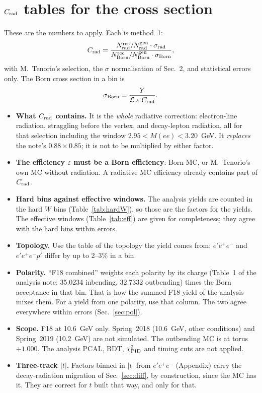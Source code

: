 \documentclass[11pt]{article}
\newcommand{\crad}{C_{\rm rad}}
\begin{document}
\section{$\crad$ tables for the cross section}\label{sec:tables}
These are the numbers to apply. Each is method~1:
\[
\crad = \frac{N^{\rm rec}_{\rm rad}/N^{\rm gen}_{\rm rad}\cdot\sigma_{\rm rad}}{N^{\rm rec}_{\rm Born}/N^{\rm gen}_{\rm Born}\cdot\sigma_{\rm Born}},
\]
with M.~Tenorio's selection, the $\sigma$ normalisation of Sec.~2, and statistical errors only. The Born cross section in a bin is
\[
\sigma_{\rm Born} = \frac{Y}{\mathcal{L}\;\varepsilon\;\crad}.
\]
\begin{itemize}
\item \textbf{What $\crad$ contains.} It is the \emph{whole} radiative correction: electron-line radiation, straggling before
the vertex, and decay-lepton radiation, all for that selection including the window $2.95<M(ee)<3.20$~GeV. It
\emph{replaces} the note's $0.88\times0.85$; it is not to be multiplied by either factor.
\item \textbf{The efficiency $\varepsilon$ must be a Born efficiency}: Born MC, or M.~Tenorio's own MC without radiation. A radiative
MC efficiency already contains part of $\crad$.
\item \textbf{Hard bins against effective windows.} The analysis yields are counted in the hard $W$ bins (Table~\ref{tab:hardW}), so those
are the factors for the yields. The effective windows (Table~\ref{tab:eff}) are given for completeness; they agree with the hard
bins within errors.
\item \textbf{Topology.} Use the table of the topology the yield comes from: $e'e^+e^-$ and $e'e^+e^-p'$ differ by up to
2--3\% in a bin.
\item \textbf{Polarity.} ``F18 combined'' weights each polarity by its charge (Table~1 of the analysis note: 35.0234 inbending, 32.7332
outbending) times the Born acceptance in that bin. That is how the summed F18 yield of the analysis mixes them. For a yield from one polarity,
use that column. The two agree everywhere within errors (Sec.~\ref{sec:pol}).
\item \textbf{Scope.} F18 at 10.6~GeV only. Spring~2018 (10.6~GeV, other conditions) and Spring~2019 (10.2~GeV) are not
simulated. The outbending MC is at torus $+1.000$. The analysis PCAL, BDT, $\chi^2_{\rm PID}$ and timing cuts are not applied.
\item \textbf{Three-track $|t|$.} Factors binned in $|t|$ from $e'e^+e^-$ (Appendix) carry the decay-radiation migration of
Sec.~\ref{sec:diff}, by construction, since the MC has it. They are correct for $t$ built that way, and only for that.
\end{itemize}
\end{document}
